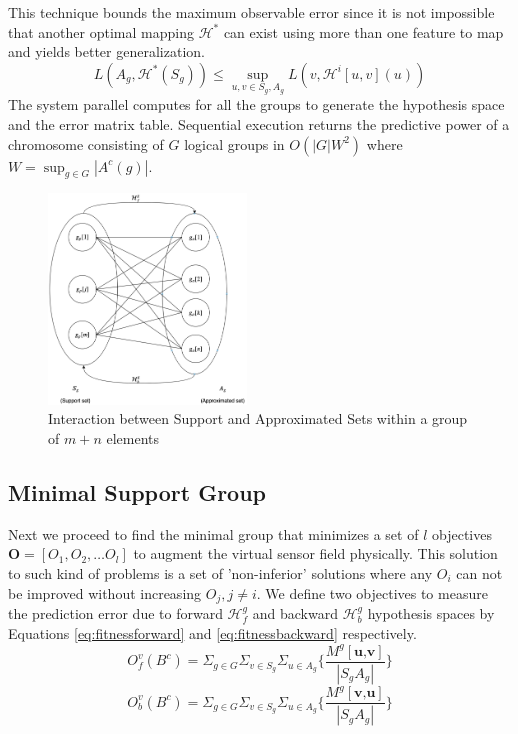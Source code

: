 This technique bounds the maximum observable error since it is not impossible that another optimal mapping $\mathcal{H}^*$ can exist using more than one feature to map and yields better generalization.
\begin{equation}
    L(A_g, \mathcal{H}^*(S_g)) \leq \sup_{u,v \in {S_g, A_g}}  L( v, \mathcal{H}^i[u,v](u)) 
\end{equation}
The system parallel computes for all the groups to generate the hypothesis space and the error matrix table.
Sequential execution returns the predictive power of a chromosome consisting of $G$ logical groups in $O(|G|W^2 )$ where $W = \sup_{g \in G} |A^c(g)|$. 
\begin{figure}%
    \centering
    \includegraphics[width=0.47\textwidth]{img/supportApprox.png} %
    \caption{Interaction between Support and Approximated Sets within a group of $m+n$ elements }%
    \label{fig:systemDesign}%
\end{figure}



\subsection{Minimal Support Group}

Next we proceed to find the minimal group that minimizes a set of $l$ objectives $\mathbf{O}=[O_1, O_2, \dots O_l]$ to augment the virtual sensor field physically. 
This solution to such kind of problems is a set of 'non-inferior' solutions where any $O_i$ can not be improved without increasing $O_j , j \neq i$.  
We define two objectives to measure the prediction error due to forward  $\mathcal{H}^g_f$ and backward $\mathcal{H}^g_b$ hypothesis spaces by Equations \ref{eq:fitnessforward} and \ref{eq:fitnessbackward} respectively.
\begin{equation} 
O^v_f (B^c) =\Sigma_{g \in G} \Sigma_{v \in S_g} \Sigma_{u \in A_g} \Big\{ \frac{M^g[\textbf{u,v}]}{|S_g A_g|} \Big\} 
\label{eq:fitnessforward}
\end{equation}
\begin{equation} 
O^v_b (B^c) =\Sigma_{g \in G} \Sigma_{v \in S_g} \Sigma_{u \in A_g} \Big\{ \frac{M^g[\textbf{v,u}]}{|S_g A_g|} \Big\} 
\label{eq:fitnessbackward}
\end{equation}

